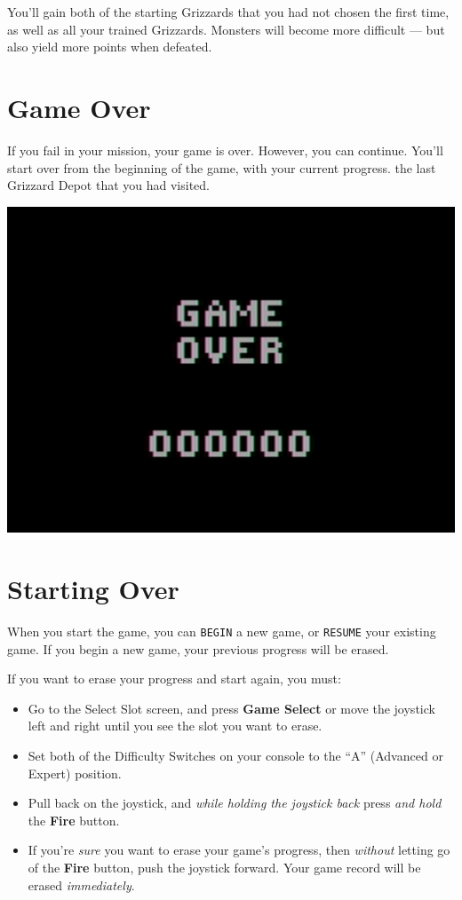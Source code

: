 \documentclass[9pt,twocolumn,openany,article]{memoir}
\newenvironment{ritemize}{\begin{itemize}\raggedright}{\end{itemize}}
\begin{document}
You'll gain both  of the starting Grizzards that you  had not chosen the
first time, as well as all  your trained Grizzards. Monsters will become
more difficult — but also yield more points when defeated.

\ifdefined\ATARIAGESAVE\pagebreak\fi
\section{Game Over}

If  you fail  in  your mission,  your  game is  over.  However, you  can
continue. You'll start over from  \ifdefined\NOSAVE the beginning of the
game, with your current progress. \else the last Grizzard Depot that you
had visited. \fi

\begin{center}
  \includegraphics[width=.75\columnwidth]{../Manual/GameOverNTSC.png}
\end{center}

\section{Starting Over}\label{Starting Your Adventure Over}

\ifdefined\NOSAVE

When  you  start  the  game,  you can  \texttt{BEGIN}  a  new  game,  or
\texttt{RESUME}  your existing  game.  If  you begin  a  new game,  your
previous progress will be erased.

\else

If you want to erase your progress and start again, you must:

\begin{ritemize}
\item Go  to the Select Slot  screen, and press \textbf{Game  Select} or
  move  the joystick  left and  right until  you see  the slot  you want
  to erase.
\item Set both  of the Difficulty Switches on your  console to the ``A''
  (Advanced or Expert) position.
\item Pull  back on the  joystick, and \emph{while holding  the joystick
    back} press \emph{and hold} the \textbf{Fire} button.
\item If you're \emph{sure} you want to erase your game's progress, then
  \emph{without}  letting  go  of  the \textbf{Fire}  button,  push  the
  joystick  forward. \ifdefined\DEMO  Your  game record  will be  erased
  \emph{immediately}. \fi
\end{ritemize}
\end{document}
